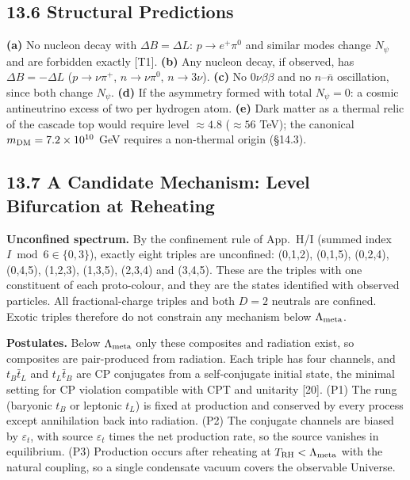 \subsection*{13.6  Structural Predictions}

\noindent \textbf{(a) }No nucleon decay with $\Delta B=\Delta L$: $p\to e^+\pi^0$ and similar modes change $N_\psi$ and are forbidden exactly [T1]. \textbf{(b) }Any nucleon decay, if observed, has $\Delta B=-\Delta L$ ($p\to\nu\pi^+$, $n\to\nu\pi^0$, $n\to3\nu$). \textbf{(c) }No $0\nu\beta\beta$ and no $n$--$\bar n$ oscillation, since both change $N_\psi$. \textbf{(d) }If the asymmetry formed with total $N_\psi=0$: a cosmic antineutrino excess of two per hydrogen atom. \textbf{(e) }Dark matter as a thermal relic of the cascade top would require level $\approx4.8$ ($\approx56$ TeV); the canonical $m_{\rm DM}=7.2\times10^{10}$ GeV requires a non-thermal origin (§14.3).

\subsection*{13.7  A Candidate Mechanism: Level Bifurcation at Reheating}

\noindent \textbf{Unconfined spectrum. }By the confinement rule of App.~H/I (summed index $I \bmod 6\in\{0,3\}$), exactly eight triples are unconfined: (0,1,2), (0,1,5), (0,2,4), (0,4,5), (1,2,3), (1,3,5), (2,3,4) and (3,4,5). These are the triples with one constituent of each proto-colour, and they are the states identified with observed particles. All fractional-charge triples and both $D=2$ neutrals are confined. Exotic triples therefore do not constrain any mechanism below $\Lambda_{\rm meta}$.

\noindent \textbf{Postulates. }Below $\Lambda_{\rm meta}$ only these composites and radiation exist, so composites are pair-produced from radiation. Each triple has four channels, and $t_B\bar t_L$ and $t_L\bar t_B$ are CP conjugates from a self-conjugate initial state, the minimal setting for CP violation compatible with CPT and unitarity [20]. (P1) The rung (baryonic $t_B$ or leptonic $t_L$) is fixed at production and conserved by every process except annihilation back into radiation. (P2) The conjugate channels are biased by $\varepsilon_t$, with source $\varepsilon_t$ times the net production rate, so the source vanishes in equilibrium. (P3) Production occurs after reheating at $T_{\rm RH}<\Lambda_{\rm meta}$ with the natural coupling, so a single condensate vacuum covers the observable Universe.

